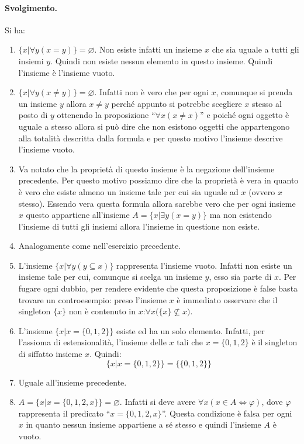 \paragraph*{Svolgimento.} Si ha:
\begin{enumerate}
	\item  $\{x | \forall y(x=y) \} = \varnothing$. Non esiste infatti un insieme $x$ che sia uguale a tutti gli insiemi $y$. Quindi non esiste nessun elemento in questo insieme. Quindi l'insieme è l'insieme vuoto.
	\item $\{x|\forall y(x \neq y)\}= \varnothing$. Infatti non è vero che per ogni $x$, comunque si prenda un insieme $y$ allora $x \neq y$ perché appunto si potrebbe scegliere $x$ stesso al posto di $y$ ottenendo la proposizione ``$\forall x(x \neq x)$'' e poiché ogni oggetto è uguale a stesso allora si può dire che non esistono oggetti che appartengono alla totalità descritta dalla formula e per questo motivo l'insieme descrive l'insieme vuoto.
	\item Va notato che la proprietà di questo insieme è la negazione dell'insieme precedente. Per questo motivo possiamo dire che la proprietà è vera in quanto è vero che esiste almeno un insieme tale per cui sia uguale ad $x$ (ovvero $x$ stesso). Essendo vera questa formula allora sarebbe vero che per ogni insieme $x$ questo appartiene all'insieme $A=\{x|\exists y(x=y)\}$ ma non esistendo l'insieme di tutti gli insiemi allora l'insieme in questione non esiste.
	\item Analogamente come nell'esercizio precedente.
	\item L'insieme $\{x|\forall y(y \subseteq x)\}$ rappresenta l'insieme vuoto. Infatti non esiste un insieme tale per cui, comunque si scelga un insieme $y$, esso sia parte di $x$. Per fugare ogni dubbio, per rendere evidente che questa proposizione è false basta trovare un controesempio: preso l'insieme $x$ è immediato osservare che il singleton $\{x\}$ non è contenuto in $x$:$\forall x \bigl(\{x\} \nsubseteq x \bigr)$.
	\item L'insieme $\{x|x=\{0,1,2\}\}$ esiste ed ha un solo elemento. Infatti, per l'assioma di estensionalità, l'insieme delle $x$ tali che $x=\{0,1,2\}$ è il singleton di siffatto insieme $x$. Quindi:
	\begin{displaymath}
		\{x|x=\{0,1,2\}\} = \bigl\{ \{0,1,2\}  \bigr\}
	\end{displaymath}
	\item Uguale all'insieme precedente.
	\item $A=\{x|x=\{0,1,2,x\}\}=\varnothing$. Infatti si deve avere $\forall x(x \in A \iff \varphi)$, dove $\varphi$ rappresenta il predicato ``$x=\{0,1,2,x\}$''. Questa condizione è falsa per ogni $x$ in quanto nessun insieme appartiene a sé stesso e quindi l'insieme $A$ è vuoto. \hfill \blacksquare
\end{enumerate}
